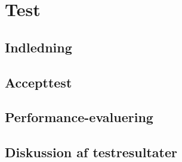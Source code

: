 \documentclass[rapport.tex]{subfiles}
\begin{document}
\section{Test}
	\subsection{Indledning}
	\subsection{Accepttest}
	\subsection{Performance-evaluering}
	\subsection{Diskussion af testresultater}
		
\end{document}
